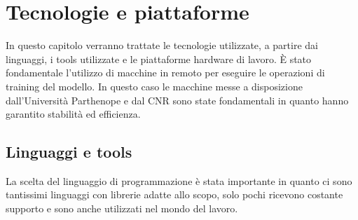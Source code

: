 \def\baselinestretch{1}
\chapter{Tecnologie e piattaforme} \label{cap2}
\def\baselinestretch{1.66}

\def\baselinestretch{1.66}
\noindent In questo capitolo verranno trattate le tecnologie utilizzate, a partire dai linguaggi, i tools utilizzate e le piattaforme hardware di lavoro. È stato fondamentale l’utilizzo di macchine in remoto per eseguire le operazioni di training del modello. In questo caso le macchine messe a disposizione dall’Università Parthenope e dal CNR sono state fondamentali in quanto hanno garantito stabilità ed efficienza.

\section{Linguaggi e tools}
\def\baselinestretch{1.66}
\noindent La scelta del linguaggio di programmazione è stata importante in quanto ci sono tantissimi linguaggi con librerie adatte allo scopo, solo pochi ricevono costante supporto e sono anche utilizzati nel mondo del lavoro.

